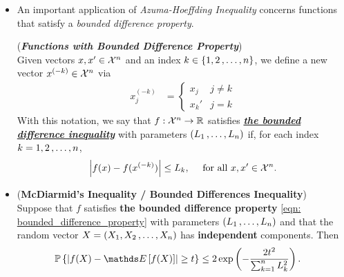 \documentclass[11pt]{article}
\begin{document}
\begin{itemize}
\item An important application of \emph{Azuma-Hoeffding Inequality} concerns functions that satisfy a \emph{bounded difference property}. 
\begin{definition} (\textbf{\emph{Functions with Bounded Difference Property}})\\
Given vectors $x, x' \in {\mathcal X}^n$ and an index $k \in \left\{1, 2 \,{,}\ldots{,}\, n\right\}$, we define a new vector $x^{(-k)} \in {\mathcal X}^n$ via
\begin{align*}
x_j^{(-k)} &= \left\{\begin{array}{cc}
x_j & j \neq k\\
x_k'& j = k
\end{array}
\right.
\end{align*}
With this notation, we say that $f: {\mathcal X}^n \to {\mathbb R}$ satisfies \underline{\textbf{\emph{the bounded difference inequality}}} with parameters $(L_1 \,{,}\ldots{,}\, L_n)$ if, for each index $k = 1, 2 \,{,}\ldots{,}\, n$,
\begin{align}
\left\lvert f(x) - f(x^{(-k)}) \right\rvert \le L_k, \quad\text{ for all }x, x' \in {\mathcal X}^n. \label{eqn: bounded_difference_property}
\end{align}
\end{definition}

\item \begin{corollary} (\textbf{McDiarmid's Inequality / Bounded Differences Inequality})\citep{wainwright2019high}\\
Suppose that $f$ satisfies \textbf{the bounded difference property} \eqref{eqn: bounded_difference_property} with parameters $(L_1 \,{,}\ldots{,}\, L_n)$ and that the random vector $X = (X_1, X_2 \,{,}\ldots{,}\, X_n)$ has \textbf{independent} components. Then
\begin{align}
\bP\set{\abs{f(X) - \E{}{f(X)}} \ge t } &\le  2 \exp\paren{- \frac{2 t^2}{ \sum_{k=1}^{n}L_k^2}}. \label{ineqn: macdiarmid_bounded_difference_inequality}
\end{align}
\end{corollary}
\end{itemize}


\newpage


\end{document}
